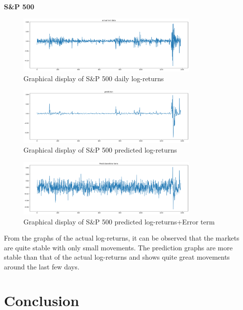\documentclass[a4paper,11pt,oneside]{book}
\begin{document}
\textbf{S\&P 500}

\begin{figure}[!h]
	\centering
	\includegraphics[width=0.8\textwidth]{figures/sanptest}
	\caption{Graphical display of S\&P 500 daily log-returns}
	\label{sanptest}
\end{figure}

\begin{figure}[!h]
	\centering
	\includegraphics[width=0.8\textwidth]{figures/sanppred}
	\caption{Graphical display of S\&P 500 predicted log-returns}
	\label{sanpred}
\end{figure}
\newpage

\begin{figure}[!h]
	\centering
	\includegraphics[width=0.8\textwidth]{figures/sanperror}
	\caption{Graphical display of S\&P 500 predicted log-returns+Error term}
	\label{sanpERROR}
\end{figure}
	From the graphs of the actual log-returns, it can be observed that the markets are quite stable with only small movements. The prediction graphs are more stable than that of the actual log-returns and shows quite great movements around the last few days.
	



\chapter{Conclusion}
\end{document}
